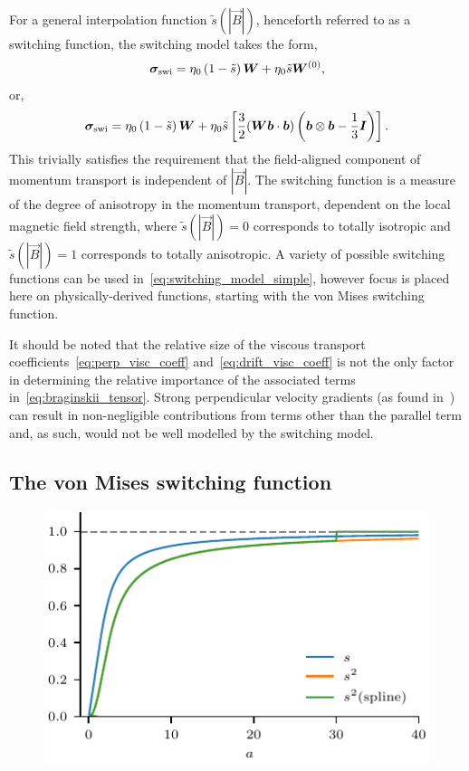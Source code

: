 For a general interpolation function $\tilde{s}(|\vec{B}|)$, henceforth referred to as a switching function, the switching model takes the form,
\begin{equation}
  \label{eq:switching_model_simple}
{\bm \sigma}_{\text{swi}} = \eta_0 \left( 1 - \tilde{s} \right) {\bm W} + \eta_0 \tilde{s} {\bm W}^{(0)},
\end{equation}
or,
\begin{equation}
  \label{eq:switching_model}
{\bm \sigma}_{\text{swi}} = \eta_0 \left( 1 - \tilde{s} \right) {\bm W} + \eta_0 \tilde{s} \left[\frac{3}{2}({\bm W}{\bm b}\cdot{\bm b}) \left( {\bm b} \otimes {\bm b} - \frac{1}{3}{\bm I} \right)\right].
\end{equation}
This trivially satisfies the requirement that the field-aligned component of momentum transport is independent of $|\vec{B}|$. The switching function is a measure of the degree of anisotropy in the momentum transport, dependent on the local magnetic field strength, where $\tilde{s}(|\vec{B}|) = 0$ corresponds to totally isotropic and $\tilde{s}(|\vec{B}|) = 1$ corresponds to totally anisotropic. A variety of possible switching functions can be used in~\eqref{eq:switching_model_simple}, however focus is placed here on physically-derived functions, starting with the von Mises switching function.

It should be noted that the relative size of the viscous transport coefficients~\eqref{eq:perp_visc_coeff} and~\eqref{eq:drift_visc_coeff} is not the only factor in determining the relative importance of the associated terms in~\eqref{eq:braginskii_tensor}. Strong perpendicular velocity gradients (as found in~\cite{rudermanSlowSurfaceWave2000a}) can result in non-negligible contributions from terms other than the parallel term and, as such, would not be well modelled by the switching model.

\subsection{The von Mises switching function}

\label{sec:switching_function}

\begin{figure}[t]
  \centering
  \includegraphics[width=0.5\linewidth]{s_against_a.pdf}
  \label{fig:s_against_a}
\end{figure}


